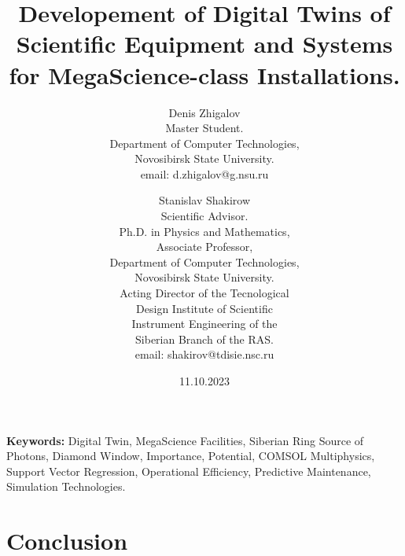 \documentclass[12pt]{article}
\begin{document}
\title{Developement of Digital Twins of Scientific Equipment and Systems for MegaScience-class Installations.}
\author{
  Denis Zhigalov\\ 
  \small{Master Student.} \\ 
  \small{Department of Computer Technologies,} \\ 
  \small{Novosibirsk State University.} \\
  \small{email: d.zhigalov@g.nsu.ru}
  \and 
  Stanislav Shakirow \\ 
  \small{Scientific Advisor.} \\
  \small{Ph.D. in Physics and Mathematics,} \\
  \small{Associate Professor,} \\
  \small{Department of Computer Technologies,} \\ 
  \small{Novosibirsk State University.} \\
  \small {Acting Director of the Tecnological} \\ 
  \small {Design Institute of Scientific} \\
  \small{Instrument Engineering of the} \\
  \small{Siberian Branch of the RAS.} \\
  \small{email: shakirov@tdisie.nsc.ru}
}
\date{11.10.2023}
\maketitle


\begin{abstract}
  
\end{abstract}

\textbf{Keywords:} Digital Twin, MegaScience Facilities, Siberian Ring Source
of Photons, Diamond Window, Importance, Potential, COMSOL Multiphysics, Support
Vector Regression, Operational Efficiency, Predictive
Maintenance, Simulation Technologies.












\section{Conclusion}




\end{document}
